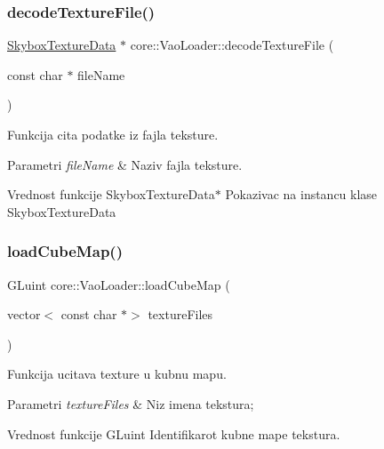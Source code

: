 \subsubsection{\texorpdfstring{decode\+Texture\+File()}{decodeTextureFile()}}
{\footnotesize\ttfamily \hyperlink{classtexture_1_1SkyboxTextureData}{Skybox\+Texture\+Data} $\ast$ core\+::\+Vao\+Loader\+::decode\+Texture\+File (\begin{DoxyParamCaption}\item[{const char $\ast$}]{file\+Name }\end{DoxyParamCaption})\hspace{0.3cm}{\ttfamily [private]}}



Funkcija cita podatke iz fajla teksture. 


\begin{DoxyParams}{Parametri}
{\em file\+Name} & Naziv fajla teksture. \\
\hline
\end{DoxyParams}
\begin{DoxyReturn}{Vrednost funkcije}
Skybox\+Texture\+Data$\ast$ Pokazivac na instancu klase Skybox\+Texture\+Data 
\end{DoxyReturn}
\mbox{\label{classcore_1_1VaoLoader_a98165161bee2940808fe5e546dfa25d9}} 
\subsubsection{\texorpdfstring{load\+Cube\+Map()}{loadCubeMap()}}
{\footnotesize\ttfamily G\+Luint core\+::\+Vao\+Loader\+::load\+Cube\+Map (\begin{DoxyParamCaption}\item[{vector$<$ const char $\ast$$>$}]{texture\+Files }\end{DoxyParamCaption})}



Funkcija ucitava texture u kubnu mapu. 


\begin{DoxyParams}{Parametri}
{\em texture\+Files} & Niz imena tekstura; \\
\hline
\end{DoxyParams}
\begin{DoxyReturn}{Vrednost funkcije}
G\+Luint Identifikarot kubne mape tekstura. 
\end{DoxyReturn}
\mbox{\label{classcore_1_1VaoLoader_aeefd4de3346c1036d8d7249694fd404d}} 

